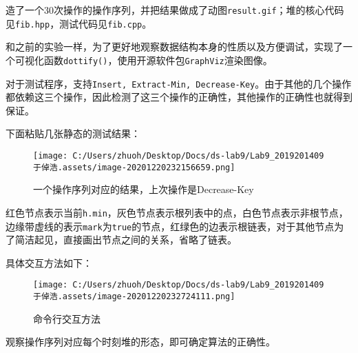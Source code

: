 \documentclass[]{article}
\begin{document}
造了一个30次操作的操作序列，并把结果做成了动图\texttt{result.gif}；堆的核心代码见\texttt{fib.hpp}，测试代码见\texttt{fib.cpp}。

和之前的实验一样，为了更好地观察数据结构本身的性质以及方便调试，实现了一个可视化函数\texttt{dottify()}，使用开源软件包\texttt{GraphViz}渲染图像。

对于测试程序，支持\texttt{Insert,\ Extract-Min,\ Decrease-Key}。由于其他的几个操作都依赖这三个操作，因此检测了这三个操作的正确性，其他操作的正确性也就得到保证。

下面粘贴几张静态的测试结果：

\begin{figure}
\centering
\texttt{[image: C:/Users/zhuoh/Desktop/Docs/ds-lab9/Lab9\_2019201409于倬浩.assets/image-20201220232156659.png]}
\caption{一个操作序列对应的结果，上次操作是Decrease-Key}
\end{figure}

红色节点表示当前\texttt{h.min}，灰色节点表示根列表中的点，白色节点表示非根节点，边缘带虚线的表示\texttt{mark}为\texttt{true}的节点，红绿色的边表示根链表，对于其他节点为了简洁起见，直接画出节点之间的关系，省略了链表。

具体交互方法如下：

\begin{figure}
\centering
\texttt{[image: C:/Users/zhuoh/Desktop/Docs/ds-lab9/Lab9\_2019201409于倬浩.assets/image-20201220232724111.png]}
\caption{命令行交互方法}
\end{figure}

观察操作序列对应每个时刻堆的形态，即可确定算法的正确性。
\end{document}
